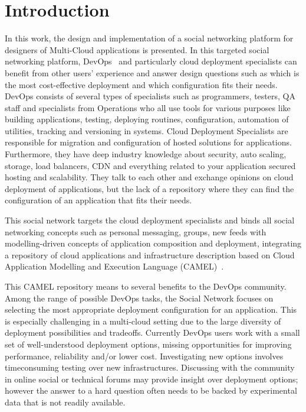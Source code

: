 \chapter{Introduction}
In this work, the design and implementation of a social networking platform for designers of Multi-Cloud applications is presented. In this targeted social networking platform, DevOps~\cite{loukides2012devops} and particularly cloud deployment specialists can benefit from other users' experience and answer design questions such as which is the most cost-effective deployment and which configuration fits their needs.  DevOps consists of several types of specialists such as programmers, testers, QA staff and specialists from Operations who all use tools for various purposes like building applications, testing, deploying routines, configuration, automation of utilities, tracking and versioning in systems.  
Cloud Deployment Specialists are responsible for migration and configuration of hosted solutions for applications. Furthermore, they have deep industry knowledge about security, auto scaling, storage, load balancers, CDN and everything related to your application secured hosting and scalability. They talk to each other and exchange opinions on cloud deployment of applications, but the lack of a repository where they can find the configuration of an application that fits their needs.

This social network targets the cloud deployment specialists and binds all social networking concepts such as personal messaging, groups, new feeds with modelling-driven concepts of application composition and deployment, integrating a repository of cloud applications and infrastructure description based on Cloud Application Modelling and Execution Language (CAMEL)~\cite{paasagedeliverable212}. 

This CAMEL repository means to several benefits to the DevOps community.
Among the range of possible DevOps tasks, the Social Network focuses on selecting the most appropriate deployment
configuration for an application. This is especially challenging in a multi-cloud setting due to the
large diversity of deployment possibilities and tradeoffs. Currently DevOps users work with a small set of
well-understood deployment options, missing opportunities for improving performance, reliability and/or
lower cost. Investigating new options involves timeconsuming testing over new infrastructures. Discussing
with the community in online social or technical forums may provide insight over deployment options;
however the answer to a hard question often needs to be backed by experimental data that is not readily
available. 

